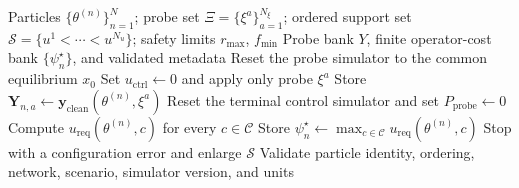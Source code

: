 \documentclass[11pt]{article}
\begin{document}
\begin{algorithm}[htbp]
\caption{Offline construction of shared probe and control banks}
\label{alg:banks}
\begin{algorithmic}[1]
\Require Particles \(\{\theta^{(n)}\}_{n=1}^{N}\); probe set \(\Xi=\{\xi^a\}_{a=1}^{N_\xi}\); ordered support set \(\mathcal S=\{u^1<\cdots<u^{N_u}\}\); safety limits \(r_{\max}\), \(f_{\min}\)
\Ensure Probe bank \(Y\), finite operator-cost bank \(\{\psi_n^\star\}\), and validated metadata
        \State Reset the probe simulator to the common equilibrium \(x_0\)
        \State Set \(u_{\mathrm{ctrl}}\gets0\) and apply only probe \(\xi^a\)
        \State Store \(\mathbf Y_{n,a}\gets\mathbf y_{\mathrm{clean}}(\theta^{(n)},\xi^a)\)
    \EndFor
    \State Reset the terminal control simulator and set \(P_{\mathrm{probe}}\gets0\)
    \State Compute \(u_{\mathrm{req}}(\theta^{(n)},c)\) for every \(c\in\mathcal C\)
    \State Store \(\psi_n^\star\gets\max_{c\in\mathcal C}u_{\mathrm{req}}(\theta^{(n)},c)\)
        \State Stop with a configuration error and enlarge \(\mathcal S\)
    \EndIf
\EndFor
\State Validate particle identity, ordering, network, scenario, simulator version, and units
\end{algorithmic}
\end{algorithm}
\end{document}
